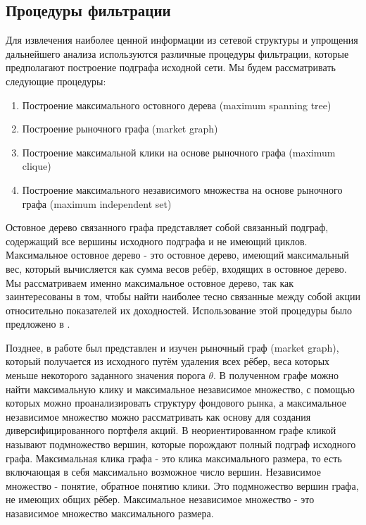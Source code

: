 \subsection{Процедуры фильтрации}

Для извлечения наиболее ценной информации из сетевой структуры и упрощения дальнейшего анализа используются различные процедуры фильтрации, которые предполагают построение подграфа исходной сети. Мы будем рассматривать следующие процедуры:

\begin{enumerate}
	\item Построение максимального остовного дерева (maximum spanning tree)
	\item Построение рыночного графа (market graph)
	\item Построение максимальной клики на основе рыночного графа (maximum clique)
	\item Построение максимального независимого множества на основе рыночного графа (maximum independent set)
\end{enumerate}

Остовное дерево связанного графа представляет собой связанный подграф, содержащий все вершины исходного подграфа и не имеющий циклов.  Максимальное остовное дерево - это остовное дерево, имеющий максимальный вес, который вычисляется как сумма весов ребёр, входящих в остовное дерево. Мы рассматриваем именно максимальное остовное дерево, так как заинтересованы в том, чтобы найти наиболее тесно связанные между собой акции относительно показателей их доходностей. Использование этой процедуры было предложено в \cite{mst2}.

Позднее, в работе \cite{mg} был представлен и изучен рыночный граф (market graph), который получается из исходного путём удаления всех рёбер, веса которых меньше некоторого заданного значения порога $\theta$. В полученном графе можно найти максимальную клику и максимальное независимое множество, с помощью которых можно проанализировать структуру фондового рынка, а максимальное независимое множество можно рассматривать как основу для создания диверсифицированного портфеля акций. В неориентированном графе кликой называют подмножество вершин, которые порождают полный подграф исходного графа. Максимальная клика графа - это клика максимального размера, то есть включающая в себя максимально возможное число вершин. Независимое множество - понятие, обратное понятию клики. Это подмножество вершин графа, не имеющих общих рёбер. Максимальное независимое множество - это назависимое множество максимального размера.

